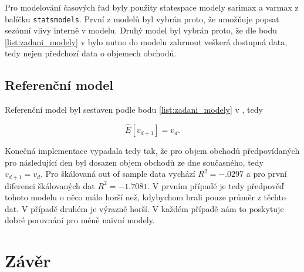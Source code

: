 \documentclass[a4paper,12pt, czech]{article}
\newcommand{\code}[1]{\texttt{#1}}
\begin{document}
Pro modelování časových řad byly použity statespace modely  \gls{sarimax} a \gls{varmax} z balíčku \code{statsmodels}.
První z modelů byl vybrán proto, že umožňuje popsat sezónní vlivy interně v modelu.
Druhý model byl vybrán proto, že dle bodu \ref{list:zadani_modely} v  bylo nutno do modelu zahrnout veškerá dostupná data, tedy nejen předchozí data o objemech obchodů.

\subsection{Referenční model}

Referenční model byl sestaven podle bodu \ref{list:zadani_modely} v , tedy

\begin{equation}\label{eq:reference}
\hat{E}\left[v_{d+1}\right] = v_d.
\end{equation}

Konečná implementace vypadala tedy tak, že pro objem obchodů předpovídaných pro následující den byl dosazen objem obchodů ze dne současného, tedy $v_{d+1} = v_d$.
Pro škálovaná out of sample data vychází $R^2=\num{-.0297}$ a pro první diferenci škálovaných dat $R^2=\num{-1.7081}$.
V prvním případě je tedy předpověď tohoto modelu o něco málo horší než, kdybychom brali pouze průměr z těchto dat.
V případě druhém je výrazně horší.
V každém případě nám to poskytuje dobré porovnání pro méně naivní modely.

\subsection{}

\subsection{}

\clearpage

\section{Závěr}



\clearpage
\singlespacing
\printnoidxglossary[type=acronym,title=Seznam zkratek,sort=word]
\end{document}
